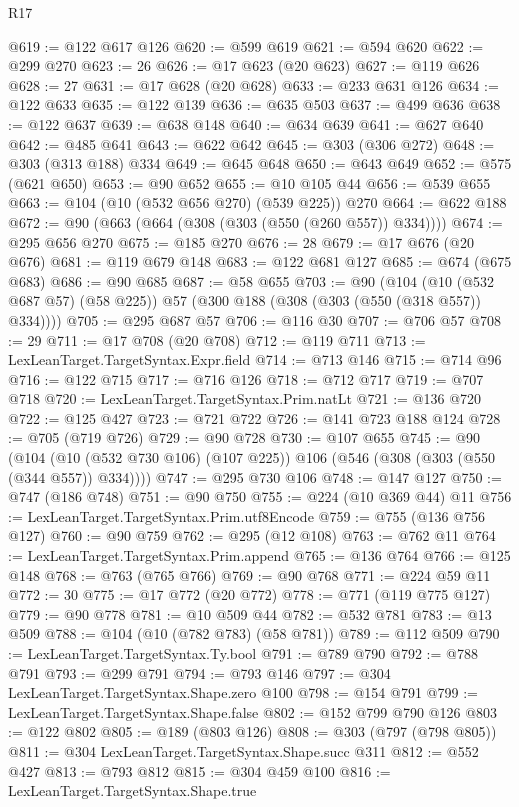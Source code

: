 \begin{lexlean}{R17}
\begin{coremodule}
{{{{{{{{{{{{{{{{{{{{{{{{{{{{{{{{{{{{{{{{{{{{{{{{{{{{{{{{{{{{{{{{{{{{{{{{{{{{{{{{{{{{{{{{{{{{{{{{{{{{{{{{{{{@619 := @122 @617 @126
@620 := @599 @619
@621 := @594 @620
@622 := @299 @270
@623 := 26
@626 := @17 @623 (@20 @623)
@627 := @119 @626
@628 := 27
@631 := @17 @628 (@20 @628)
@633 := @233 @631 @126
@634 := @122 @633
@635 := @122 @139
@636 := @635 @503
@637 := @499 @636
@638 := @122 @637
@639 := @638 @148
@640 := @634 @639
@641 := @627 @640
@642 := @485 @641
@643 := @622 @642
@645 := @303 (@306 @272)
@648 := @303 (@313 @188) @334
@649 := @645 @648
@650 := @643 @649
@652 := @575 (@621 @650)
@653 := @90 @652
@655 := @10 @105 @44
@656 := @539 @655
@663 := @104 (@10 (@532 @656 @270) (@539 @225)) @270
@664 := @622 @188
@672 := @90 (@663 (@664 (@308 (@303 (@550 (@260 @557)) @334))))
@674 := @295 @656 @270
@675 := @185 @270
@676 := 28
@679 := @17 @676 (@20 @676)
@681 := @119 @679 @148
@683 := @122 @681 @127
@685 := @674 (@675 @683)
@686 := @90 @685
@687 := @58 @655
@703 := @90
    (@104 (@10 (@532 @687 @57) (@58 @225)) @57 (@300 @188 (@308 (@303 (@550 (@318 @557)) @334))))
@705 := @295 @687 @57
@706 := @116 @30
@707 := @706 @57
@708 := 29
@711 := @17 @708 (@20 @708)
@712 := @119 @711
@713 := LexLeanTarget.TargetSyntax.Expr.field
@714 := @713 @146
@715 := @714 @96
@716 := @122 @715
@717 := @716 @126
@718 := @712 @717
@719 := @707 @718
@720 := LexLeanTarget.TargetSyntax.Prim.natLt
@721 := @136 @720
@722 := @125 @427
@723 := @721 @722
@726 := @141 @723 @188 @124
@728 := @705 (@719 @726)
@729 := @90 @728
@730 := @107 @655
@745 := @90
    (@104 (@10 (@532 @730 @106) (@107 @225)) @106 (@546 (@308 (@303 (@550 (@344 @557)) @334))))
@747 := @295 @730 @106
@748 := @147 @127
@750 := @747 (@186 @748)
@751 := @90 @750
@755 := @224 (@10 @369 @44) @11
@756 := LexLeanTarget.TargetSyntax.Prim.utf8Encode
@759 := @755 (@136 @756 @127)
@760 := @90 @759
@762 := @295 (@12 @108)
@763 := @762 @11
@764 := LexLeanTarget.TargetSyntax.Prim.append
@765 := @136 @764
@766 := @125 @148
@768 := @763 (@765 @766)
@769 := @90 @768
@771 := @224 @59 @11
@772 := 30
@775 := @17 @772 (@20 @772)
@778 := @771 (@119 @775 @127)
@779 := @90 @778
@781 := @10 @509 @44
@782 := @532 @781
@783 := @13 @509
@788 := @104 (@10 (@782 @783) (@58 @781))
@789 := @112 @509
@790 := LexLeanTarget.TargetSyntax.Ty.bool
@791 := @789 @790
@792 := @788 @791
@793 := @299 @791
@794 := @793 @146
@797 := @304 LexLeanTarget.TargetSyntax.Shape.zero @100
@798 := @154 @791
@799 := LexLeanTarget.TargetSyntax.Shape.false
@802 := @152 @799 @790 @126
@803 := @122 @802
@805 := @189 (@803 @126)
@808 := @303 (@797 (@798 @805))
@811 := @304 LexLeanTarget.TargetSyntax.Shape.succ @311
@812 := @552 @427
@813 := @793 @812
@815 := @304 @459 @100
@816 := LexLeanTarget.TargetSyntax.Shape.true
}}}}}}}}}}}}}}}}}}}}}}}}}}}}}}}}}}}}}}}}}}}}}}}}}}}}}}}}}}}}}}}}}}}}}}}}}}}}}}}}}}}}}}}}}}}}}}}}}}}}}}}}}}}
\end{coremodule}
\end{lexlean}

